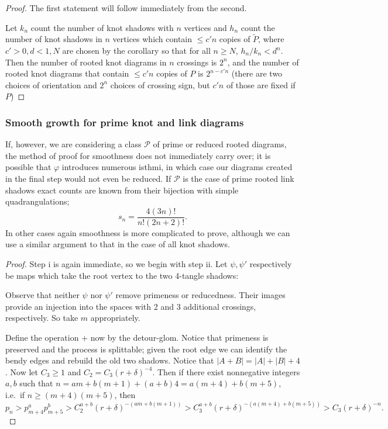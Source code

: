 \documentclass[amsmath,longbibliography,secnumarabic,floatfix,amssymb,nofootinbib,nobibnotes,letterpaper,11pt,notitlepage,tightenlines]{revtex4-1}
\newcommand{\PrimeShad}{\mathscr{P}}
\newcommand{\Shad}[1]{\tilde{#1}}
\begin{document}
\begin{proof}
  The first statement will follow immediately from the second.

  Let $k_n$ count the number of knot shadows with $n$ vertices and
  $h_n$ count the number of knot shadows in $n$ vertices which contain
  $\le c'n$ copies of $\Shad{P}$, where $c' > 0, d < 1, N$ are chosen
  by the corollary so that for all $n \ge N$, $h_n/k_n < d^n$. Then
  the number of rooted knot diagrams in $n$ crossings is $2^{n}$,
  and the number of rooted knot diagrams that contain $\le c'n$
  copies of $P$ is $2^{n-c'n}$ (there are two choices of orientation
  and $2^n$ choices of crossing sign, but $c'n$ of those are fixed if
  $P$)
\end{proof}

\subsubsection{Smooth growth for prime knot and link diagrams}
\label{sec:smoothprime}

If, however, we are considering a class $\PrimeShad$ of prime or reduced rooted diagrams, the method
of proof for smoothness does not immediately carry over; it is possible that $\varphi$ introduces
numerous isthmi, in which case our diagrams created in the final step would not even be reduced. If
$\PrimeShad$ is the case of prime rooted link shadows exact counts are known from their bijection
with simple quadrangulations;
\[ s_n = \frac{4(3n)!}{n!(2n + 2)!}.\]
In other cases again smoothness is more complicated to prove, although we can use a similar argument
to that in the case of all knot shadows.

\begin{proof}
  Step i is again immediate, so we begin with step ii. Let $\psi, \psi'$ respectively be maps which
  take the root vertex to the two 4-tangle shadows:

  Observe that neither $\psi$ nor $\psi'$ remove primeness or reducedness. Their images provide an
  injection into the spaces with 2 and 3 additional crossings, respectively. So take $m$
  appropriately.

  Define the operation $+$ now by the detour-glom. Notice that primeness is preserved and the
  process is splittable; given the root edge we can identify the bendy edges and rebuild the old two
  shadows. Notice that $|A + B| = |A| + |B| + 4$. Now let $C_3 \ge 1$ and $C_2 = C_3(r +
  \delta)^{-4}$. Then if there exist nonnegative integers $a, b$ such that $n = am + b(m+1) + (a+b)4
  = a(m + 4) + b(m+5)$, i.e.\ if $n \ge (m+4)(m+5)$, then
  \[ p_n > p_{m+4}^ap_{m+5}^b > C_2^{a+b}(r+\delta)^{-(am+b(m+1))} > C_3^{a+b}(r+\delta)^{-(a(m+4) + b(m+5))}
  > C_3(r+\delta)^{-n}.\]
\end{proof}
\end{document}
